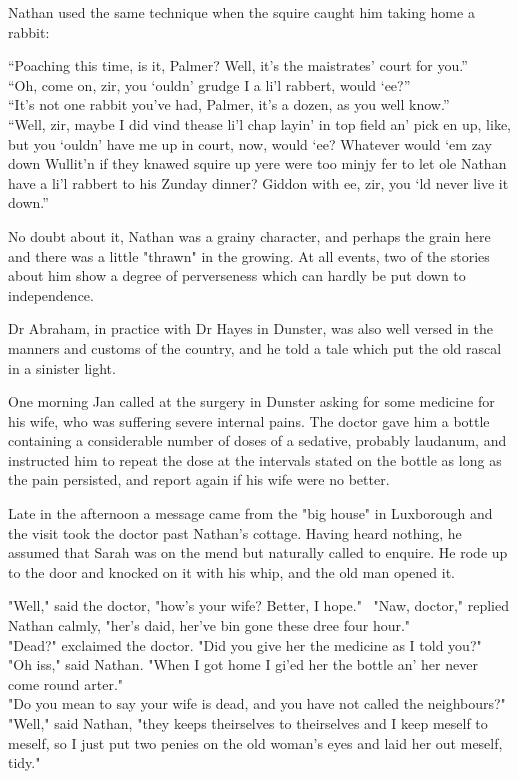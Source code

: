 Nathan used the same technique when the squire caught him taking home a rabbit:

 “Poaching this time, is it, Palmer? Well, it’s the maistrates’ court for you.”\\
 “Oh, come on, zir, you ‘ouldn’ grudge I a li’l rabbert, would ‘ee?”\\
 “It’s not one rabbit you’ve had, Palmer, it’s a dozen, as you well know.”\\
 “Well, zir, maybe I did vind thease li’l chap layin’ in top field an’ pick en up, like, but you ‘ouldn’ have me up in court, now, would ‘ee? Whatever would ‘em zay down Wullit’n if they knawed squire up yere were too minjy fer to let ole Nathan have a li’l rabbert to his Zunday dinner? Giddon with ee, zir, you ‘ld never live it down.”
 
No doubt about it, Nathan was a grainy character, and perhaps the grain here and there was a little "thrawn" in the growing. At all events, two of the stories about him show a degree of perverseness which can hardly be put down to independence.

Dr Abraham, in practice with Dr Hayes in Dunster, was also well versed in the manners and customs of the country, and he told a tale which put the old rascal in a sinister light.

One morning Jan called at the surgery in Dunster asking for some medicine for his wife, who was suffering severe internal pains. The doctor gave him a bottle containing a considerable number of doses of a sedative, probably laudanum, and instructed him to repeat the dose at the intervals stated on the bottle as long as the pain persisted, and report again if his wife were no better.

Late in the afternoon a message came from the "big house" in Luxborough and the visit took the doctor past Nathan's cottage. Having heard nothing, he assumed that Sarah was on the mend but naturally called to enquire. He rode up to the door and knocked on it with his whip, and the old man opened it.

 "Well," said the doctor, "how's your wife? Better, I hope." \
 "Naw, doctor," replied Nathan calmly, "her's daid, her've bin gone these dree four hour."\\
 "Dead?" exclaimed the doctor. "Did you give her the medicine as I told you?"\\
 "Oh iss," said Nathan. "When I got home I gi'ed her the bottle an' her never come round arter." \\
 "Do you mean to say your wife is dead, and you have not called the neighbours?"\\
 "Well," said Nathan, "they keeps theirselves to theirselves and I keep meself to meself, so I just put two penies on the old woman's eyes and laid her out meself, tidy."\\


